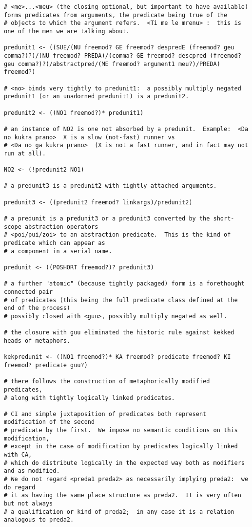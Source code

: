 \documentclass{article}
\begin{document}
\begin{verbatim}
# <me>...<meu> (the closing optional, but important to have available) forms predicates from arguments, the predicate being true of the
# objects to which the argument refers.  <Ti me le mrenu> :  this is one of the men we are talking about.

predunit1 <- ((SUE/(NU freemod? GE freemod? despredE (freemod? geu comma?)?)/(NU freemod? PREDA)/(comma? GE freemod? descpred (freemod? geu comma?)?)/abstractpred/(ME freemod? argument1 meu?)/PREDA) freemod?)

# <no> binds very tightly to predunit1:  a possibly multiply negated predunit1 (or an unadorned predunit1) is a predunit2.

predunit2 <- ((NO1 freemod?)* predunit1)

# an instance of NO2 is one not absorbed by a predunit.  Example:  <Da no kukra prano>  X is a slow (not-fast) runner vs
# <Da no ga kukra prano>  (X is not a fast runner, and in fact may not run at all).

NO2 <- (!predunit2 NO1)

# a predunit3 is a predunit2 with tightly attached arguments.

predunit3 <- ((predunit2 freemod? linkargs)/predunit2)

# a predunit is a predunit3 or a predunit3 converted by the short-scope abstraction operators
# <poi/pui/zoi> to an abstraction predicate.  This is the kind of predicate which can appear as
# a component in a serial name.

predunit <- ((POSHORT freemod?)? predunit3)

# a further "atomic" (because tightly packaged) form is a forethought connected pair
# of predicates (this being the full predicate class defined at the end of the process)
# possibly closed with <guu>, possibly multiply negated as well.

# the closure with guu eliminated the historic rule against kekked heads of metaphors.

kekpredunit <- ((NO1 freemod?)* KA freemod? predicate freemod? KI freemod? predicate guu?)

# there follows the construction of metaphorically modified predicates, 
# along with tightly logically linked predicates.

# CI and simple juxtaposition of predicates both represent modification of the second
# predicate by the first.  We impose no semantic conditions on this modification,
# except in the case of modification by predicates logically linked with CA,
# which do distribute logically in the expected way both as modifiers and as modified.
# We do not regard <preda1 preda2> as necessarily implying preda2:  we do regard
# it as having the same place structure as preda2.  It is very often but not always
# a qualification or kind of preda2;  in any case it is a relation analogous to preda2.


\end{verbatim}
\end{document}
